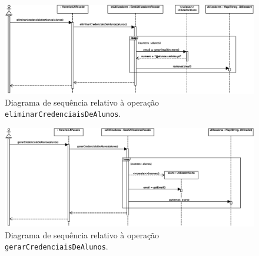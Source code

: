 \documentclass[12pt, a4paper]{article}
\begin{document}
\begin{landscape}
        \vspace*{\fill}
        \pagebreak
        \vspace*{\fill}

        \begin{figure}[H]
            \centering
            \includegraphics[scale=0.8]{Imagens/Modelos/eliminarCredenciaisDeAlunos.svg.eps}
            \caption{
                Diagrama de sequência relativo à operação \texttt{eliminarCredenciaisDeAlunos}.
            }
        \end{figure}

        \vspace*{\fill}
        \pagebreak
        \vspace*{\fill}

        \begin{figure}[H]
            \centering
            \includegraphics[scale=0.9]{Imagens/Modelos/gerarCredenciaisDeAlunos.svg.eps}
            \caption{
                Diagrama de sequência relativo à operação \texttt{gerarCredenciaisDeAlunos}.
            }
        \end{figure}

        \vspace*{\fill}
        \pagebreak
        \vspace*{\fill}


\end{landscape}
\end{document}
